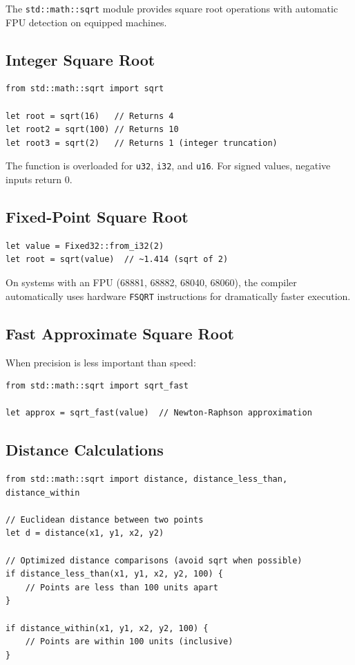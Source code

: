 The \texttt{std::math::sqrt} module provides square root operations with automatic FPU detection on equipped machines.

\subsection{Integer Square Root}

\begin{lstlisting}
from std::math::sqrt import sqrt

let root = sqrt(16)   // Returns 4
let root2 = sqrt(100) // Returns 10
let root3 = sqrt(2)   // Returns 1 (integer truncation)
\end{lstlisting}

The function is overloaded for \texttt{u32}, \texttt{i32}, and \texttt{u16}. For signed values, negative inputs return 0.

\subsection{Fixed-Point Square Root}

\begin{lstlisting}
let value = Fixed32::from_i32(2)
let root = sqrt(value)  // ~1.414 (sqrt of 2)
\end{lstlisting}

\begin{tipbox}
On systems with an FPU (68881, 68882, 68040, 68060), the compiler automatically uses hardware \texttt{FSQRT} instructions for dramatically faster execution.
\end{tipbox}

\subsection{Fast Approximate Square Root}

When precision is less important than speed:

\begin{lstlisting}
from std::math::sqrt import sqrt_fast

let approx = sqrt_fast(value)  // Newton-Raphson approximation
\end{lstlisting}

\subsection{Distance Calculations}

\begin{lstlisting}
from std::math::sqrt import distance, distance_less_than, distance_within

// Euclidean distance between two points
let d = distance(x1, y1, x2, y2)

// Optimized distance comparisons (avoid sqrt when possible)
if distance_less_than(x1, y1, x2, y2, 100) {
    // Points are less than 100 units apart
}

if distance_within(x1, y1, x2, y2, 100) {
    // Points are within 100 units (inclusive)
}
\end{lstlisting}

